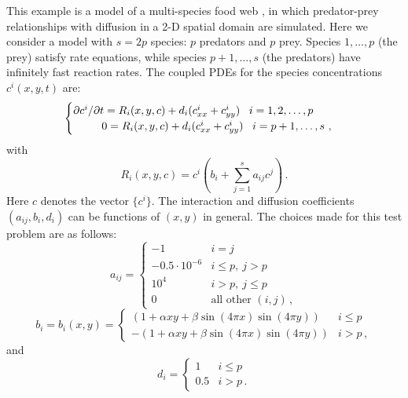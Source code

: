 This example is a model of a multi-species food web \cite{Bro:86}, in
which predator-prey relationships with diffusion in a 2-D spatial
domain are simulated.  Here we consider a model with $s = 2p$ species:
$p$ predators and $p$ prey.  Species $1,\ldots, p$ (the prey) satisfy
rate equations, while species $p+1,\ldots, s$ (the predators) have
infinitely fast reaction rates.  The coupled PDEs for the species
concentrations $c^i(x,y,t)$ are:
\begin{equation}\label{e:iwebsb_PDE}
  \begin{cases}
    \partial c^i / \partial t = R_i(x,y,c) + d_i 
    ( c^i_{xx} + c^i_{yy} ) \, ~~ i = 1,2,\ldots,p \\
    \hspace*{.36in}        0 = R_i(x,y,c) + d_i 
    ( c^i_{xx} + c^i_{yy} ) \, ~~ i = p+1,\ldots,s ~,
  \end{cases}
\end{equation}
with
\[
R_i(x,y,c) = c^i \left( b_i + \sum_{j=1}^s a_{ij} c^j \right) \, .
\]
Here $c$ denotes the vector $\{c^i\}$.
The interaction and diffusion coefficients $(a_{ij},b_i,d_i)$ can be
functions of $(x,y)$ in general. The choices made for this test
problem are as follows:
\begin{equation*}
  a_{ij} = 
  \begin{cases}
    -1                 & i=j \\
    -0.5 \cdot 10^{-6} & i \leq p , ~ j > p  \\
    10^4               & i > p , ~ j \leq p  \\
    0                  & \mbox{all other } (i,j) \, ,
  \end{cases}
\end{equation*}
\begin{equation*}
  b_i = b_i(x,y) = 
  \begin{cases}
    (1 + \alpha xy + \beta \sin(4\pi x)\sin(4\pi y) )  & i \leq p  \\
    - (1 + \alpha xy + \beta \sin(4\pi x)\sin(4\pi y) )  & i > p \, ,
  \end{cases}
\end{equation*}
and
\begin{equation*}
  d_i = 
  \begin{cases}
    1 & i \leq p  \\
    0.5 & i > p  \, .
  \end{cases}
\end{equation*}

